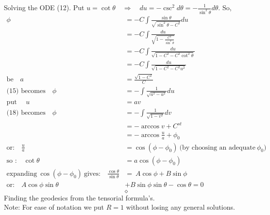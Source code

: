 Solving the ODE (12). Put $u = \cot \theta \quad \Rightarrow \quad du = - \csc^2 d\theta = -\frac{1}{\sin^2\theta} d\theta$. So,  
\begin{align}
\phi &= -C\int \frac{\sin \theta}{ \sqrt{\sin^2 \theta - C^2}}du\\
&= -C\int \frac{du}{ \sqrt{1- \frac{C^2 }{\sin^2 \theta}}}\\
&= -C\int \frac{du}{ \sqrt{1- C^2 - C^2 \cot^2 \theta}}\\
&= -C\int \frac{du}{ \sqrt{1- C^2 - C^2 u^2}}\\
\text{be}\quad a&= \frac{\sqrt{1-C^2}}{C}\\
\text{(15) becomes}\quad \phi &= -\int \frac{1}{ \sqrt{a^2 -  u^2}}du\\
\text{put }\quad u &= av\\
\text{(18) becomes}\quad \phi &= -\int \frac{1}{ \sqrt{1 -  v^2}}dv\\
\ &= -\arccos v + C^{st}\\
\ &= -\arccos \frac{u}{a}  + \phi_0\\
\text{or:}\quad \frac{u}{a} &= \cos (\phi - \phi_0)  \ \text{(by choosing an adequate}\ \phi_0\text{)}\\
\text{so :}\quad \cot\theta &= a \cos (\phi - \phi_0)  \\
\text{expanding} \  \cos (\phi - \phi_0)\  \text{gives:} \quad  \frac{\cos\theta}{\sin\theta} &= \ A\cos\phi + B\sin\phi\\
\text{or:} \quad  A\cos\phi \sin\theta &+ B\sin\phi\sin\theta -\cos\theta=0
\end{align}
$$\diamond$$
\newpage
Finding the geodesics from the tensorial formula's.\\
Note: For ease of notation we put $R=1$ without losing any general solutions.

